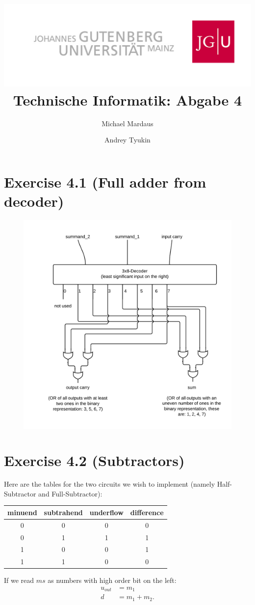 \documentclass[10pt,a4paper]{scrartcl}
\author{Michael Mardaus \and Andrey Tyukin}
\title{\includegraphics[scale=0.2]{../logo_schriftzug}\\
Technische Informatik: Abgabe 4}
\newcommand{\subExercise}[1]{\vspace{0.5em} \noindent{\bf #1)}}
\begin{document}
\maketitle

\section*{Exercise 4.1 (Full adder from decoder)}

\vspace{1em}
\begin{figure}[h]
  \centering\includegraphics[width=0.6\linewidth]{images/fullAdder.png}
\end{figure}
\vspace{1em}

\FloatBarrier
\newpage
\section*{Exercise 4.2 (Subtractors)}
\subExercise{a}
Here are the tables for the two circuits we wish to implement 
(namely Half-Subtractor and Full-Subtractor):

\vspace{0.5em}
\begin{tabular}{|c c|c c|}
  \hline
  minuend & subtrahend & underflow & difference \\
  \hline
  0 & 0 & 0 & 0 \\
  0 & 1 & 1 & 1 \\
  1 & 0 & 0 & 1 \\
  1 & 1 & 0 & 0 \\
  \hline
\end{tabular}

If we read $ms$ as numbers with high order bit on the left: 
\begin{align*}
  u_{out} &= m_1 \\
  d &= m_1 + m_2.
\end{align*}
\end{document}
